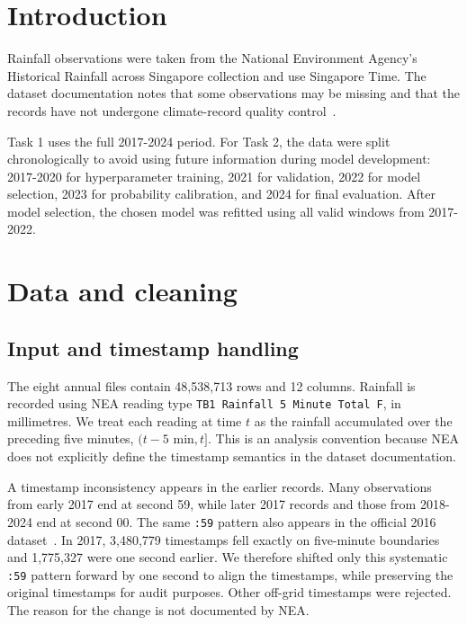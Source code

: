 \documentclass[11pt,a4paper]{article}
\begin{document}
\begingroup
\small
\setlength{\parskip}{0pt}
\tableofcontents
\endgroup
\clearpage
{}

\section{Introduction}
Rainfall observations were taken from the National Environment Agency's
Historical Rainfall across Singapore collection and use Singapore Time. The
dataset documentation notes that some observations may be missing and that the
records have not undergone climate-record quality control~\cite{nea}.

Task 1 uses the full 2017-2024 period. For Task 2, the data were split
chronologically to avoid using future information during model development:
2017-2020 for hyperparameter training, 2021 for validation, 2022 for model
selection, 2023 for probability calibration, and 2024 for final evaluation.
After model selection, the chosen model was refitted using all valid windows
from 2017-2022.

\section{Data and cleaning}
\subsection{Input and timestamp handling}
The eight annual files contain 48,538,713 rows and 12 columns. Rainfall is
recorded using NEA reading type \texttt{TB1 Rainfall 5 Minute Total F}, in
millimetres. We treat each reading at time $t$ as the rainfall accumulated over
the preceding five minutes, $(t-5\text{ min},t]$. This is an analysis
convention because NEA does not explicitly define the timestamp semantics in
the dataset documentation.

A timestamp inconsistency appears in the earlier records. Many observations
from early 2017 end at second 59, while later 2017 records and those from
2018-2024 end at second 00. The same \texttt{:59} pattern also appears in the
official 2016 dataset~\cite{nea}. In 2017, 3,480,779 timestamps fell exactly on
five-minute boundaries and 1,775,327 were one second earlier. We therefore
shifted only this systematic \texttt{:59} pattern forward by one second to
align the timestamps, while preserving the original timestamps for audit
purposes. Other off-grid timestamps were rejected. The reason for the change
is not documented by NEA.
\end{document}
